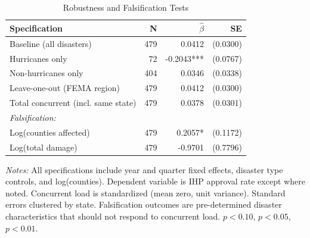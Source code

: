 \begin{table}[htbp]
\centering
\caption{Robustness and Falsification Tests}
\label{tab:robustness}
\small
\begin{tabular}{lrrr}
\toprule
Specification & N & $\hat{\beta}$ & SE \\
\midrule
Baseline (all disasters) & 479 & 0.0412 & (0.0300) \\
Hurricanes only & 72 & -0.2043*** & (0.0767) \\
Non-hurricanes only & 404 & 0.0346 & (0.0338) \\
Leave-one-out (FEMA region) & 479 & 0.0412 & (0.0300) \\
Total concurrent (incl. same state) & 479 & 0.0378 & (0.0301) \\
\textit{Falsification:} & & & \\
\quad Log(counties affected) & 479 & 0.2057* & (0.1172) \\
\quad Log(total damage) & 479 & -0.9701 & (0.7796) \\
\bottomrule
\end{tabular}
\par\vspace{0.3em}
{\footnotesize \textit{Notes:} All specifications include year and quarter fixed effects, disaster type controls, and log(counties). Dependent variable is IHP approval rate except where noted. Concurrent load is standardized (mean zero, unit variance). Standard errors clustered by state. Falsification outcomes are pre-determined disaster characteristics that should not respond to concurrent load. \sym{*} $p<0.10$, \sym{**} $p<0.05$, \sym{***} $p<0.01$.}
\end{table}
